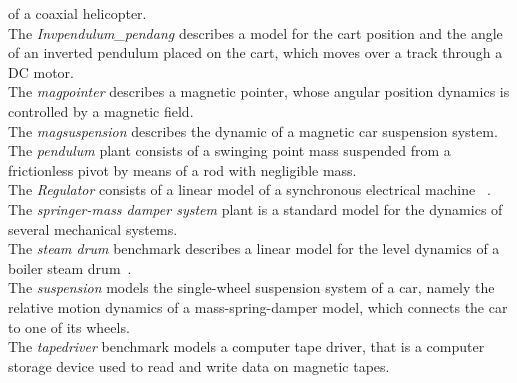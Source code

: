 \documentclass[twocolumn]{autart}    %
\begin{document}
of a coaxial helicopter. \\ 
%
The \textit{Invpendulum\_pendang}  
describes a model for the cart position and the angle of an inverted pendulum placed on the cart,  
which moves over a track through a DC motor. \\ 
%
The \textit{magpointer}  describes a magnetic pointer, 
whose angular position dynamics is controlled by a magnetic field. \\ 
%
The \textit{magsuspension} describes  the dynamic of a magnetic car suspension system. \\
The \textit{pendulum}  plant consists of a swinging point mass suspended from a frictionless pivot by means of a rod with negligible mass.  \\ 
%
The \textit{Regulator} consists of a linear model of a synchronous electrical machine%
~\cite{KOKOTOVIC198023}. \\
The \textit{springer-mass damper system} plant is a standard model for the dynamics of several mechanical systems. \\ 
The \textit{steam drum} benchmark describes a linear model for the level dynamics of a boiler steam drum~\cite{boiler}. \\ 
%
The \textit{suspension} models the single-wheel suspension system of a car, 
namely the relative motion dynamics of a mass-spring-damper model, which connects the car to one of its wheels.  \\
The \textit{tapedriver} benchmark models a computer tape driver, 
that is a computer storage device used to read and write data on magnetic tapes. 

\end{document}

